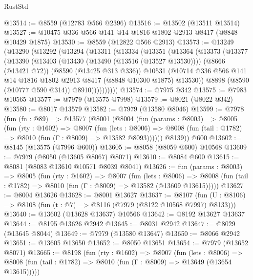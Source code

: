 \begin{lexlean}{RustStd}
\begin{coremodule}
@13514 := @8559 (@12783 @566 @2396)
@13516 := @13502 (@13511 @13514)
@13527 := @10475 @336 @566 @141 @14 @1816 @1802 @2913 @8417 (@8848 @10429 @1875)
@13530 := @8559 (@12822 @566 @2913)
@13573 := @13249
    (@13290
      (@13292
        (@13294
          (@13311
            (@13334
              (@13351
                (@13364
                  (@13373
                    (@13377
                      (@13390
                        (@13403
                          (@13430 (@13490 (@13516 (@13527 @13530))))
                          (@8666 (@13421 @72))
                          (@8590 (@13425 @313 @336))
                          @10531
                          (@10714
                            @336
                            @566
                            @141
                            @14
                            @1816
                            @1802
                            @2913
                            @8417
                            (@8848 @10300 @1875)
                            @13530))
                        @8898
                        (@8590 (@10777 @590 @314))
                        @8910))))))))))
@13574 := @7975 @342
@13575 := @7983 @10565
@13577 := @7979 (@13575 @7998)
@13579 := @8021 (@8022 @342)
@13580 := @8017 @13579
@13582 := @7979 (@13580 @8046)
@13599 := @7978
    (fun (fn : @89) =>
    @13577
      (@8001
        (@8004
          (fun (params : @8003) =>
          @8005
            (fun (rty : @1602) =>
            @8007
              (fun (lets : @8006) =>
              @8008 (fun (tail : @1782) => @8010 (fun (Γ : @8009) => @13582 @8093))))))
        @8139))
    @600
@13602 := @8145 (@13575 (@7996 @600))
@13605 := @8058 (@8059 @600) @10568
@13609 := @7979 (@8050 (@13605 @8067) @8071)
@13610 := @8084 @600
@13615 := @8081 (@8083 @13610 @10571 @8039 @8041)
@13626 := fun (params : @8003) =>
  @8005
    (fun (rty : @1602) =>
    @8007
      (fun (lets : @8006) =>
      @8008 (fun (tail : @1782) => @8010 (fun (Γ : @8009) => @13582 (@13609 @13615)))))
@13627 := @8004 @13626
@13628 := @8001 @13627
@13637 := @8107
    (fun (U : @8106) => @8108 (fun (t : @7) => @8116 (@7979 (@8122 @10568 @7997) @8133)))
@13640 := @13602 (@13628 @13637) @10566
@13642 := @8192 @13627 @13637
@13644 := @8195 @13626 @2942
@13645 := @8031 @2942
@13647 := @8029 (@13645 @8044)
@13649 := @7979 (@13580 @13647)
@13650 := @8066 @2942
@13651 := @13605 @13650
@13652 := @8050 @13651
@13654 := @7979 (@13652 @8071)
@13665 := @8198
    (fun (rty : @1602) =>
    @8007
      (fun (lets : @8006) =>
      @8008 (fun (tail : @1782) => @8010 (fun (Γ : @8009) => @13649 (@13654 @13615)))))

\end{coremodule}
\end{lexlean}
